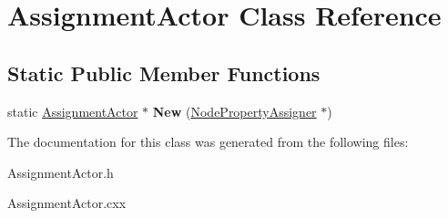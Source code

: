 \hypertarget{class_assignment_actor}{
\section{AssignmentActor Class Reference}
\label{class_assignment_actor}
}
\subsection*{Static Public Member Functions}
\begin{DoxyCompactItemize}
\item 
\hypertarget{class_assignment_actor_a8c45cbc9c6dc5c738bf1b610bd197452}{
static \hyperlink{class_assignment_actor}{AssignmentActor} $\ast$ {\bfseries New} (\hyperlink{class_node_property_assigner}{NodePropertyAssigner} $\ast$)}
\label{class_assignment_actor_a8c45cbc9c6dc5c738bf1b610bd197452}

\end{DoxyCompactItemize}


The documentation for this class was generated from the following files:\begin{DoxyCompactItemize}
\item 
AssignmentActor.h\item 
AssignmentActor.cxx\end{DoxyCompactItemize}
